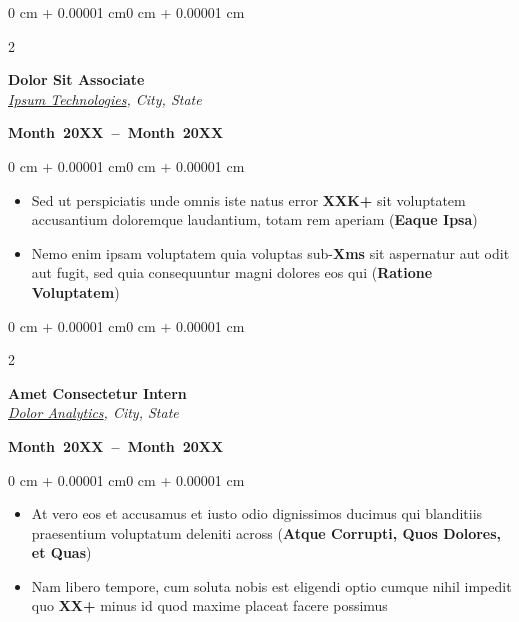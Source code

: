 \documentclass[10pt, letterpaper]{article}
\newenvironment{onecolentry}{
\begin{adjustwidth}{0 cm + 0.00001 cm}{0 cm + 0.00001 cm}
    }{
\end{adjustwidth}
}
\newenvironment{twocolentry}[2][]{
\onecolentry
\def\secondColumn{#2}
\setcolumnwidth{\fill, 5.2 cm}
\begin{paracol}{2}
    }{
    \switchcolumn \raggedleft \secondColumn
\end{paracol}
\endonecolentry
}
\begin{document}
    \vspace{0.03 cm}
    \begin{twocolentry}{\mbox{\textbf{Month~20XX -- Month~20XX}}}
        \hspace*{0.1cm} \textbf{Dolor Sit Associate} \\
        \hspace*{0.1cm} \textit{\href{https://example.com}{Ipsum Technologies}, City, State}
    \end{twocolentry}
    \vspace{0.02 cm}
    \begin{onecolentry}
        \begin{itemize}[leftmargin=0.4cm + 10pt, labelsep=5pt]
            \item Sed ut perspiciatis unde omnis iste natus error \textbf{XXK+} sit voluptatem accusantium doloremque laudantium, totam rem aperiam (\textbf{Eaque Ipsa})
            \item Nemo enim ipsam voluptatem quia voluptas sub-\textbf{Xms} sit aspernatur aut odit aut fugit, sed quia consequuntur magni dolores eos qui (\textbf{Ratione Voluptatem})
        \end{itemize}
    \end{onecolentry}

    \vspace{0.03 cm}
    \begin{twocolentry}{\mbox{\textbf{Month~20XX -- Month~20XX}}}
        \hspace*{0.1cm} \textbf{Amet Consectetur Intern} \\
        \hspace*{0.1cm} \textit{\href{https://example.com}{Dolor Analytics}, City, State}
    \end{twocolentry}
    \vspace{0.02 cm}
    \begin{onecolentry}
        \begin{itemize}[leftmargin=0.4cm + 10pt, labelsep=5pt]
            \item At vero eos et accusamus et iusto odio dignissimos ducimus qui blanditiis praesentium voluptatum deleniti across (\textbf{Atque Corrupti, Quos Dolores, et Quas})
            \item Nam libero tempore, cum soluta nobis est eligendi optio cumque nihil impedit quo \textbf{XX+} minus id quod maxime placeat facere possimus
        \end{itemize}
    \end{onecolentry}
\end{document}
